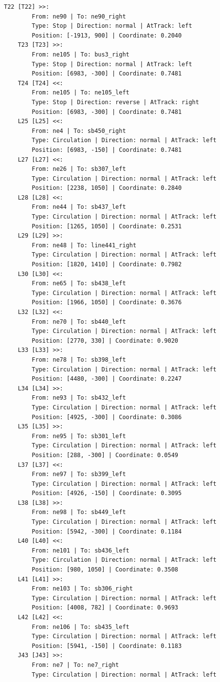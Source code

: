 \begin{lstlisting}[language = {}, tabsize=4, basicstyle=\footnotesize\ttfamily, showspaces=false, showstringspaces=false, caption = Signalling.RNA, label = {lst:EJ3_6}]
	T22 [T22] >>:
		From: ne90 | To: ne90_right
		Type: Stop | Direction: normal | AtTrack: left 
		Position: [-1913, 900] | Coordinate: 0.2040
	T23 [T23] >>:
		From: ne105 | To: bus3_right
		Type: Stop | Direction: normal | AtTrack: left 
		Position: [6983, -300] | Coordinate: 0.7481
	T24 [T24] <<:
		From: ne105 | To: ne105_left
		Type: Stop | Direction: reverse | AtTrack: right 
		Position: [6983, -300] | Coordinate: 0.7481
	L25 [L25] <<:
		From: ne4 | To: sb450_right
		Type: Circulation | Direction: normal | AtTrack: left 
		Position: [6983, -150] | Coordinate: 0.7481
	L27 [L27] <<:
		From: ne26 | To: sb307_left
		Type: Circulation | Direction: normal | AtTrack: left 
		Position: [2238, 1050] | Coordinate: 0.2840
	L28 [L28] <<:
		From: ne44 | To: sb437_left
		Type: Circulation | Direction: normal | AtTrack: left 
		Position: [1265, 1050] | Coordinate: 0.2531
	L29 [L29] >>:
		From: ne48 | To: line441_right
		Type: Circulation | Direction: normal | AtTrack: left 
		Position: [1820, 1410] | Coordinate: 0.7982
	L30 [L30] <<:
		From: ne65 | To: sb438_left
		Type: Circulation | Direction: normal | AtTrack: left 
		Position: [1966, 1050] | Coordinate: 0.3676
	L32 [L32] <<:
		From: ne70 | To: sb440_left
		Type: Circulation | Direction: normal | AtTrack: left 
		Position: [2770, 330] | Coordinate: 0.9020
	L33 [L33] >>:
		From: ne78 | To: sb398_left
		Type: Circulation | Direction: normal | AtTrack: left 
		Position: [4480, -300] | Coordinate: 0.2247
	L34 [L34] >>:
		From: ne93 | To: sb432_left
		Type: Circulation | Direction: normal | AtTrack: left 
		Position: [4925, -300] | Coordinate: 0.3086
	L35 [L35] >>:
		From: ne95 | To: sb301_left
		Type: Circulation | Direction: normal | AtTrack: left 
		Position: [288, -300] | Coordinate: 0.0549
	L37 [L37] <<:
		From: ne97 | To: sb399_left
		Type: Circulation | Direction: normal | AtTrack: left 
		Position: [4926, -150] | Coordinate: 0.3095
	L38 [L38] >>:
		From: ne98 | To: sb449_left
		Type: Circulation | Direction: normal | AtTrack: left 
		Position: [5942, -300] | Coordinate: 0.1184
	L40 [L40] <<:	
		From: ne101 | To: sb436_left
		Type: Circulation | Direction: normal | AtTrack: left 
		Position: [980, 1050] | Coordinate: 0.3508
	L41 [L41] >>:
		From: ne103 | To: sb306_right
		Type: Circulation | Direction: normal | AtTrack: left 
		Position: [4008, 782] | Coordinate: 0.9693
	L42 [L42] <<:
		From: ne106 | To: sb435_left
		Type: Circulation | Direction: normal | AtTrack: left 
		Position: [5941, -150] | Coordinate: 0.1183
	J43 [J43] >>:
		From: ne7 | To: ne7_right
		Type: Circulation | Direction: normal | AtTrack: left 

\end{lstlisting}
